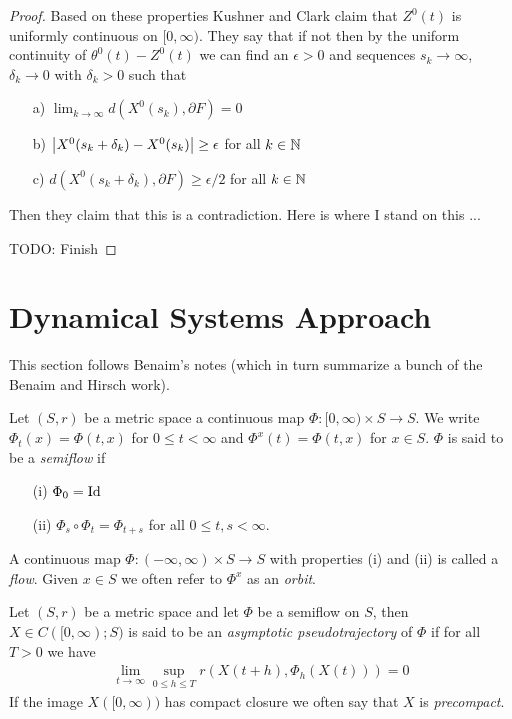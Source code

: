 \begin{proof}
Based on these properties Kushner and Clark claim that $Z^0(t)$ is uniformly continuous on $[0,\infty)$.  They say that if not then by the uniform continuity of $\theta^0(t) - Z^0(t)$ we can 
find an $\epsilon > 0$ and sequences $s_k \to \infty$, $\delta_k \to 0$ with $\delta_k > 0$ such that 
\begin{itemize}
\item[a)] $\lim_{k \to \infty} d(X^0(s_k), \partial F) = 0$
\item[b)] $\left \vert X^0(s_k+\delta_k) - X^0(s_k) \right \vert \geq \epsilon$ for all $k \in \mathbb{N}$
\item[c)] $d(X^0(s_k+\delta_k), \partial F) \geq \epsilon/2$ for all $k \in \mathbb{N}$
\end{itemize}
Then they claim that this is a contradiction.  Here is where I stand on this ...

TODO: Finish
\end{proof}

\section{Dynamical Systems Approach}

This section follows Benaim's notes (which in turn summarize a bunch of the Benaim and Hirsch work).

\begin{defn}Let $(S,r)$ be a metric space a continuous map $\Phi : [0,\infty) \times S \to S$. We write $\Phi_t(x) = \Phi(t,x)$ for $0 \leq t < \infty$ and $\Phi^x(t) = \Phi(t,x)$ for $x \in S$.  $\Phi$ is said to be a \emph{semiflow} if 
\begin{itemize}
\item[(i)] $\Phi_0 = \operatorname*{Id}$
\item[(ii)] $\Phi_s \circ \Phi_t = \Phi_{t+s}$ for all $0 \leq t,s < \infty$.
\end{itemize}
A continuous map $\Phi : (-\infty, \infty) \times S \to S$ with properties (i) and (ii) is called a \emph{flow}.  Given $x \in S$ we often refer to $\Phi^x$ as an \emph{orbit}.
\end{defn}

\begin{defn}Let $(S,r)$ be a metric space and let $\Phi$ be a semiflow on $S$, then $X \in C([0,\infty) ; S)$ is said to be an \emph{asymptotic pseudotrajectory} of $\Phi$ if for all $T > 0$ we have 
\begin{align*}
\lim_{t \to \infty} \sup_{0 \leq h \leq T} r(X(t+h), \Phi_h(X(t))) = 0
\end{align*}
If the image $X([0,\infty))$ has compact closure we often say that $X$ is \emph{precompact}.
\end{defn}

